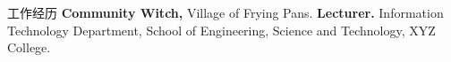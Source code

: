 \begin{rubric}{工作经历}
%
	\textbf{Community Witch,} Village of Frying Pans.
%
%
\entry*[2013 -- 2015]%
	\textbf{Lecturer.} Information Technology Department, School of Engineering, Science and Technology, XYZ College.
%
\end{rubric}